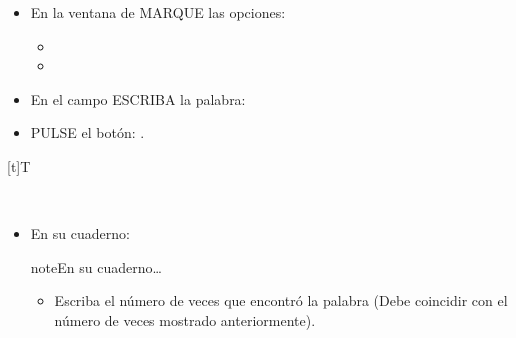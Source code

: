 \documentclass[letterpaper,10pt,spanish]{sphinxmanual}
\let\sphinxpxdimen\pdfpxdimen\else\newdimen\sphinxpxdimen
\begin{document}
\begin{enumerate}
\begin{itemize}
\item {} 
\sphinxAtStartPar
En la ventana de  MARQUE las opciones:
\begin{itemize}
\item {} 
\sphinxAtStartPar
{}

\item {} 
\sphinxAtStartPar
{}

\end{itemize}

\item {} 
\sphinxAtStartPar
En el campo  ESCRIBA la palabra: 

\item {} 
\sphinxAtStartPar
PULSE el botón: .

\end{itemize}


\begin{savenotes}\sphinxattablestart
\sphinxthistablewithglobalstyle
\centering
\begin{tabulary}{\linewidth}[t]{T}
\sphinxtoprule
\sphinxtableatstartofbodyhook

\begin{sphinxfigure-in-table}
\centering
\capstart
\noindent\sphinxincludegraphics[width=670\sphinxpxdimen]{{image19}.png}
\label{\detokenize{1_guias/10ofimatica/G1013:id12}}\end{sphinxfigure-in-table}\relax
\\
\sphinxbottomrule
\end{tabulary}
\sphinxtableafterendhook\par
\sphinxattableend\end{savenotes}
\begin{itemize}
\item {} 
\sphinxAtStartPar
En su cuaderno:

\begin{sphinxadmonition}{note}{En su cuaderno…}
\begin{itemize}
\item {} 
\sphinxAtStartPar
Escriba el número de veces que  encontró la palabra  (Debe coincidir con el número de veces mostrado anteriormente).

\end{itemize}
\end{sphinxadmonition}


\end{itemize}
\end{enumerate}
\end{document}
